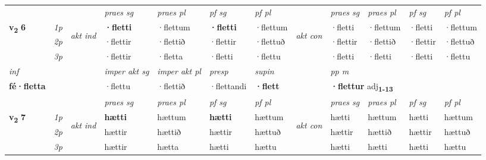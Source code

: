 \begin{longtable}[l]{X>{\footnotesize\itshape}llXXXXlXXXX}
\midrule

 & &   & \textit{praes sg}  & \textit{praes pl}    & \textit{ pf sg} & \textit{pf pl} & & \textit{praes sg}  & \textit{praes pl}    & \textit{pf sg} & \textit{pf pl }  \\ \cmidrule{4-7} \cmidrule{9-12}
 \multirow{2}{*}{{{\textbf{v{\textsubscript{2}}} \Large{\textbf{6}}}}}  & 1p & \multirow{3}{*}{\begin{turn}{90}\textit{akt ind}\end{turn}} & \textbf{·fletti} & ·flettum & \textbf{·fletti} & ·flettum & \multirow{3}{*}{\begin{turn}{90}\textit{akt con}\end{turn}} &·fletti & ·flettum & ·fletti & ·flettum\\*
 & 2p &  &  ·flettir  & ·flettið & ·flettir & ·flettuð & & ·flettir & ·flettið & ·flettir & ·flettuð \\*
 & 3p &  & ·flettir & ·fletta & ·fletti & ·flettu & & ·fletti & ·fletti& ·fletti & ·flettu \\*
\cmidrule{4-7} \cmidrule{9-12}

   {\textit{inf}} & &  & \textit{imper akt sg} & \textit{imper akt pl}   & \textit{presp} & \textit{supin}  && \textit{pp m} \\*
  {\textbf{fé\allowbreak ·fletta}} & && ·flettu  & ·flettið   & ·flettandi &  \textbf{·flett}  && \multicolumn{2}{l}{\textbf{·flettur} adj\textbf{\textsubscript{1-13}}} \\*

\midrule

 & &   & \textit{praes sg}  & \textit{praes pl}    & \textit{ pf sg} & \textit{pf pl} & & \textit{praes sg}  & \textit{praes pl}    & \textit{pf sg} & \textit{pf pl }  \\ \cmidrule{4-7} \cmidrule{9-12}
 \multirow{2}{*}{{{\textbf{v{\textsubscript{2}}} \Large{\textbf{7}}}}}  & 1p & \multirow{3}{*}{\begin{turn}{90}\textit{akt ind}\end{turn}} & \textbf{hætti} & hættum & \textbf{hætti} & hættum & \multirow{3}{*}{\begin{turn}{90}\textit{akt con}\end{turn}} &hætti & hættum & hætti & hættum\\*
 & 2p &  &  hættir  & hættið & hættir & hættuð & & hættir & hættið & hættir & hættuð \\*
 & 3p &  & hættir & hætta & hætti & hættu & & hætti & hætti& hætti & hættu \\*
\cmidrule{4-7} \cmidrule{9-12}


\end{longtable}
